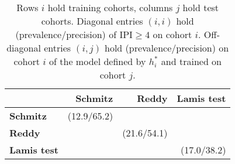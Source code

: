 \begin{table}[ht]
    \small
    \centering
    \begin{tabular}{lrrr}
        \hline
        & \textbf{Schmitz} & \textbf{Reddy} & \textbf{Lamis test} \\
        \hline
        \textbf{Schmitz} & (12.9/65.2) & & \\
        \textbf{Reddy} & & (21.6/54.1) & \\
        \textbf{Lamis test} & & & (17.0/38.2) \\
        \hline
    \end{tabular}
    \caption{Rows $i$ hold training cohorts, columns $j$ hold test cohorts. Diagonal 
        entries $(i, i)$ hold (prevalence/precision) of $\text{IPI} \geq 4$
        on cohort $i$. Off-diagonal entries $(i, j)$ hold (prevalence/precision) 
        on cohort $i$ of the model defined by $h^*_i$ and trained on cohort $j$.}
    \label{tab:inter_trial}
\end{table}